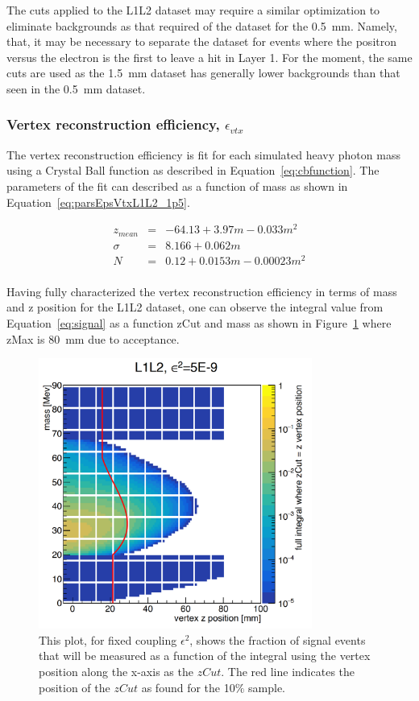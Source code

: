 The cuts applied to the L1L2 dataset may require a similar optimization to eliminate backgrounds as that required of the dataset for the 0.5~mm. Namely, that, it may be necessary to separate the dataset for events where the positron versus the electron is the first to leave a hit in Layer 1. For the moment, the same cuts are used as the 1.5~mm dataset has generally lower backgrounds than that seen in the 0.5~mm dataset.

\subsubsection{Vertex reconstruction efficiency, $\epsilon_{vtx}$}

The vertex reconstruction efficiency is fit for each simulated heavy photon mass using a Crystal Ball function as described in Equation~\eqref{eq:cbfunction}. The parameters of the fit can described as a function of mass as shown in Equation~\eqref{eq:parsEpsVtxL1L2_1p5}.

\begin{eqnarray*}
\label{eq:parsEpsVtxL1L2_1p5}
z_{mean} & = & -64.13+3.97m-0.033m^2 \\
\sigma & = & 8.166+0.062m \\
N & = & 0.12+0.0153m-0.00023m^2 \\
\end{eqnarray*}

 Having fully characterized the vertex reconstruction efficiency in terms of mass and z position for the L1L2 dataset, one can observe the integral value from Equation~\eqref{eq:signal} as a function zCut and mass as shown in Figure~\ref{fig:integral_L1L2_1p5} where zMax is 80~mm due to acceptance.

\begin{figure}[H]
  \centering
     \includegraphics[width=0.8\textwidth]{plots/L1L2_eff1p5_zm.png}
  \caption{This plot, for fixed coupling $\epsilon^2$, shows the fraction of signal events that will be measured as a function of the integral using the vertex position along the x-axis as the $zCut$. The red line indicates the position of the $zCut$ as found for the 10$\%$ sample.}
  \label{fig:integral_L1L2_1p5}
\end{figure} 

